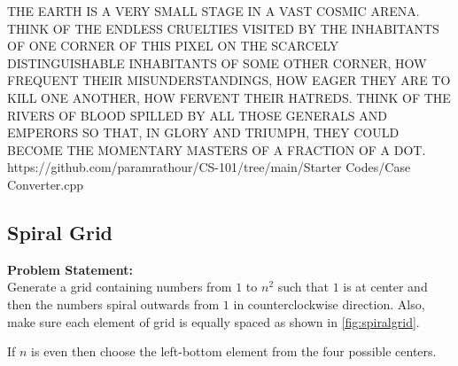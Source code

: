 {\begin{testcases}
{THE EARTH IS A VERY SMALL STAGE IN A VAST COSMIC ARENA. THINK OF THE ENDLESS CRUELTIES VISITED BY THE INHABITANTS OF ONE CORNER OF THIS PIXEL ON THE SCARCELY DISTINGUISHABLE INHABITANTS OF SOME OTHER CORNER, HOW FREQUENT THEIR MISUNDERSTANDINGS, HOW EAGER THEY ARE TO KILL ONE ANOTHER, HOW FERVENT THEIR HATREDS. THINK OF THE RIVERS OF BLOOD SPILLED BY ALL THOSE GENERALS AND EMPERORS SO THAT, IN GLORY AND TRIUMPH, THEY COULD BECOME THE MOMENTARY MASTERS OF A FRACTION OF A DOT.}
	{https://github.com/paramrathour/CS-101/tree/main/Starter Codes/Case Converter.cpp}
\end{testcases}
}
\recalctypearea
\subsection{Spiral Grid}
\textbf{Problem Statement:}\\
Generate a grid containing numbers from $1$ to $n^2$ such that $1$ is at center and then the numbers spiral outwards from $1$ in counterclockwise direction. Also, make sure each element of grid is equally spaced as shown in \ref{fig:spiralgrid}.
\begin{note}
	If $n$ is even then choose the left-bottom element from the four possible centers.
\end{note}
\begin{comment}
	\begin{figure}[H]
		\centering
		\begin{subfigure}{0.4\linewidth}
			\centering
			\begin{tabular}{rrrr}
			16 & 15 & 14 & 13 \\
			5  & 4  & 3  & 12 \\
			6  & 1  & 2  & 11 \\
			7  & 8  & 9  & 10
			\end{tabular}
			\caption{$n=4$}
		\end{subfigure}
		\begin{subfigure}{0.4\linewidth}
			\centering
			\begin{tabular}{rrrrr}
			17 & 16 & 15 & 14 & 13 \\
			18 & 5  & 4  & 3  & 12 \\
			19 & 6  & 1  & 2  & 11 \\
			20 & 7  & 8  & 9  & 10 \\
			21 & 22 & 23 & 24 & 25
			\end{tabular}
			\caption{$n=5$}
		\end{subfigure}
		\caption{Spiral Grid}
		\label{fig:spiralgrid}
	\end{figure}
\end{comment}
